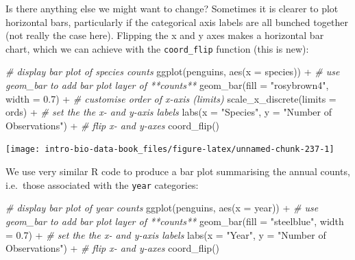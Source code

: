 \documentclass[
]{book}
\newenvironment{Shaded}{\begin{snugshade}}{\end{snugshade}}
\newcommand{\AttributeTok}[1]{\textcolor[rgb]{0.77,0.63,0.00}{#1}}
\newcommand{\CommentTok}[1]{\textcolor[rgb]{0.56,0.35,0.01}{\textit{#1}}}
\newcommand{\FloatTok}[1]{\textcolor[rgb]{0.00,0.00,0.81}{#1}}
\newcommand{\FunctionTok}[1]{\textcolor[rgb]{0.00,0.00,0.00}{#1}}
\newcommand{\NormalTok}[1]{#1}
\newcommand{\SpecialCharTok}[1]{\textcolor[rgb]{0.00,0.00,0.00}{#1}}
\newcommand{\StringTok}[1]{\textcolor[rgb]{0.31,0.60,0.02}{#1}}
\begin{document}
Is there anything else we might want to change? Sometimes it is clearer to plot horizontal bars, particularly if the categorical axis labels are all bunched together (not really the case here). Flipping the x and y axes makes a horizontal bar chart, which we can achieve with the \texttt{coord\_flip} function (this is new):

\begin{Shaded}
\begin{Highlighting}[]
\CommentTok{\# display bar plot of species counts}
\FunctionTok{ggplot}\NormalTok{(penguins, }\FunctionTok{aes}\NormalTok{(}\AttributeTok{x =}\NormalTok{ species)) }\SpecialCharTok{+} 
  \CommentTok{\# use geom\_bar to add bar plot layer of **counts**}
  \FunctionTok{geom\_bar}\NormalTok{(}\AttributeTok{fill =} \StringTok{"rosybrown4"}\NormalTok{, }\AttributeTok{width =} \FloatTok{0.7}\NormalTok{) }\SpecialCharTok{+} 
  \CommentTok{\# customise order of x{-}axis (limits)}
  \FunctionTok{scale\_x\_discrete}\NormalTok{(}\AttributeTok{limits =}\NormalTok{ ords) }\SpecialCharTok{+}
  \CommentTok{\# set the the x{-} and y{-}axis labels}
  \FunctionTok{labs}\NormalTok{(}\AttributeTok{x =} \StringTok{"Species"}\NormalTok{, }\AttributeTok{y =} \StringTok{"Number of Observations"}\NormalTok{) }\SpecialCharTok{+}
  \CommentTok{\# flip x{-} and y{-}axes}
  \FunctionTok{coord\_flip}\NormalTok{()}
\end{Highlighting}
\end{Shaded}

\begin{center}\texttt{[image: intro-bio-data-book\_files/figure-latex/unnamed-chunk-237-1]} \end{center}

We use very similar R code to produce a bar plot summarising the annual counts, i.e.~those associated with the \texttt{year} categories:

\begin{Shaded}
\begin{Highlighting}[]
\CommentTok{\# display bar plot of year counts}
\FunctionTok{ggplot}\NormalTok{(penguins, }\FunctionTok{aes}\NormalTok{(}\AttributeTok{x =}\NormalTok{ year)) }\SpecialCharTok{+} 
  \CommentTok{\# use geom\_bar to add bar plot layer of **counts**}
  \FunctionTok{geom\_bar}\NormalTok{(}\AttributeTok{fill =} \StringTok{"steelblue"}\NormalTok{, }\AttributeTok{width =} \FloatTok{0.7}\NormalTok{) }\SpecialCharTok{+} 
  \CommentTok{\# set the the x{-} and y{-}axis labels}
  \FunctionTok{labs}\NormalTok{(}\AttributeTok{x =} \StringTok{"Year"}\NormalTok{, }\AttributeTok{y =} \StringTok{"Number of Observations"}\NormalTok{) }\SpecialCharTok{+}
  \CommentTok{\# flip x{-} and y{-}axes}
  \FunctionTok{coord\_flip}\NormalTok{()}
\end{Highlighting}
\end{Shaded}
\end{document}
